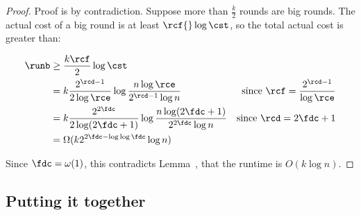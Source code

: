 \begin{fullonly}
\begin{proof}
Proof is by contradiction. Suppose more than $\frac{k}{2}$ rounds are big rounds.
The actual cost of a big round is at least ${\rcf {} \log \cst}$, so the total actual cost is greater than:

\begin{align*}
\runb & \geq \frac{k \rcf}{2} \log \cst \\
& = k \frac{2^{\rcd-1}}{2 \log \rce} \log \frac{n \log \rce}{2^{\rcd-1} \log n}
& \text{since } \rcf=\frac{2^{\rcd-1}}{\log \rce}\\
& =k \frac{2^{2\fdc}}{2 \log (2 \fdc+1)} \log \frac{n \log (2 \fdc +1)}{2^{2\fdc} \log n}
& \text{since } \rcd=2\fdc+1\\
& =  \Omega (k {2^{2\fdc-\log \log \fdc}} \log n)
\end{align*}

Since $\fdc=\omega(1)$, this contradicts Lemma~, that the runtime is $O(k \log n)$.
\end{proof}
\end{fullonly}


\subsection{Putting it together} 


